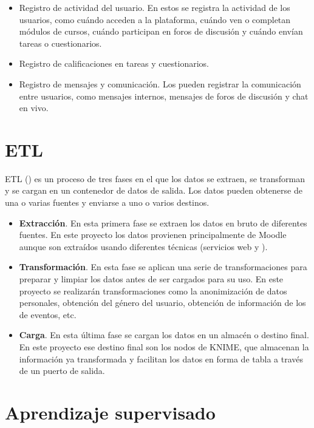 \begin{itemize}
  \item Registro de actividad del usuario. En estos  se registra la actividad de los usuarios, como cuándo 
  acceden a la plataforma, cuándo ven o completan módulos de cursos, cuándo participan en foros de discusión y
   cuándo envían tareas o cuestionarios. 
  \item Registro de calificaciones en tareas y cuestionarios.
  \item Registro de mensajes y comunicación. Los  pueden registrar la comunicación entre usuarios, 
  como mensajes internos, mensajes de foros de discusión y chat en vivo.
\end{itemize}



\section{ETL}

ETL () \cite{etl} es un proceso de tres fases en el que los datos se extraen, se transforman y se cargan en un 
contenedor de datos de salida. Los datos pueden obtenerse de una o varias fuentes y enviarse a uno o varios destinos.

\begin{itemize}
	\item \textbf{Extracción}. En esta primera fase se extraen los datos en bruto de diferentes fuentes. En este proyecto los datos 
    provienen principalmente de Moodle aunque son extraídos usando diferentes técnicas (servicios web y ). 
	\item \textbf{Transformación}. En esta fase se aplican una serie de transformaciones para preparar y limpiar los datos antes de 
	ser cargados para su uso. En este proyecto se realizarán transformaciones como la anonimización de datos personales, 
    obtención del género del usuario, obtención de información de los  de eventos, etc.     
	\item \textbf{Carga}. En esta última fase se cargan los datos en un almacén o destino final. En este proyecto ese destino final son 
	los nodos de KNIME, que almacenan la información ya transformada y facilitan los datos en forma de tabla a través de un puerto de salida. 
\end{itemize}



\section{Aprendizaje supervisado}

